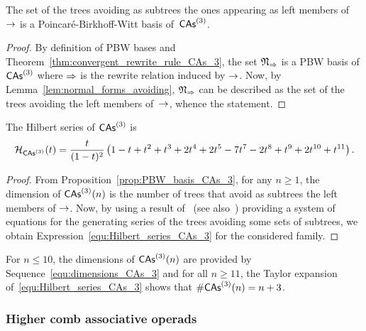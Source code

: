\begin{Proposition} \label{prop:PBW_basis_CAs_3}
    The set of the trees avoiding as subtrees the ones appearing as
    left members of $\operatorname{\to}$ is a Poincaré-Birkhoff-Witt basis
    of~$\mathsf{CAs}^{\left(3\right)}$.
\end{Proposition}
\begin{proof}
    By definition of PBW bases and
    Theorem~\ref{thm:convergent_rewrite_rule_CAs_3}, the set
    $\mathfrak{N}_{\operatorname{\Rightarrow}}$ is a PBW basis of $\mathsf{CAs}^{\left(3\right)}$ where
    $\operatorname{\Rightarrow}$ is the rewrite relation induced by $\operatorname{\to}$. Now, by
    Lemma~\ref{lem:normal_forms_avoiding}, $\mathfrak{N}_{\operatorname{\Rightarrow}}$
    can be described as the set of the trees avoiding the left members
    of~$\operatorname{\to}$, whence the statement.
\end{proof}
\medbreak

\begin{Proposition} \label{prop:Hilbert_series_CAs_3}
    The Hilbert series of $\mathsf{CAs}^{\left(3\right)}$ is
    \begin{equation} \label{equ:Hilbert_series_CAs_3}
        \mathcal{H}_{\mathsf{CAs}^{\left(3\right)}}(t) = \frac{t}{(1 - t)^2}
        \left(1 - t + t^2 + t^3 + 2t^4 + 2t^5 - 7t^7 - 2t^8 + t^9 +
        2t^{10} + t^{11}\right).
    \end{equation}
\end{Proposition}
\begin{proof}
    From Proposition~\ref{prop:PBW_basis_CAs_3}, for any $n \geq 1$, the
    dimension of $\mathsf{CAs}^{\left(3\right)}(n)$ is the number of trees that avoid as
    subtrees the left members of $\operatorname{\to}$. Now, by using a result
    of~\cite{Gir18} (see also~\cite{Row10,KP15}) providing a system of
    equations for the generating series of the trees avoiding some sets
    of subtrees, we obtain Expression~\eqref{equ:Hilbert_series_CAs_3}
    for the considered family.
\end{proof}
\medbreak

For $n \leq 10$, the dimensions of $\mathsf{CAs}^{\left(3\right)}(n)$ are provided by
Sequence~\eqref{equ:dimensions_CAs_3} and for all $n \geq 11$, the
Taylor expansion of~\eqref{equ:Hilbert_series_CAs_3} shows that
$\# \mathsf{CAs}^{\left(3\right)}(n) = n + 3$.
\medbreak


\subsubsection{Higher comb associative operads}
\label{sec:higher_comb_associative_operads}

